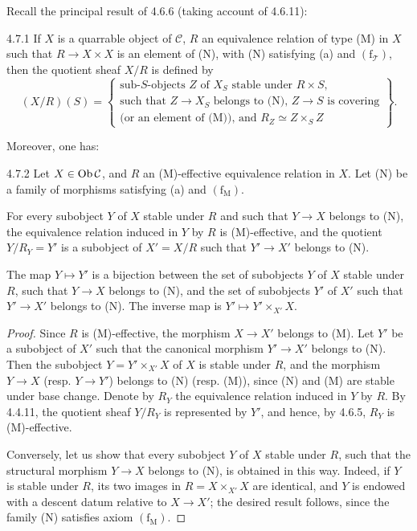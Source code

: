Recall the principal result of 4.6.6 (taking account of 4.6.11):
\begin{proposition}{4.7.1}\label{IV.4.7.1}
If \(X\) is a quarrable object of \(\mathcal C\),
\(R\) an equivalence relation of type (M) in \(X\)
such that \(R\to X\times X\) is an element of (N),
with (N) satisfying (a) and \((\mathrm f_{\mathcal T})\),
then the quotient sheaf \(X/R\) is defined by
\[
(X/R)(S)=\left\{\begin{array}{l}
\text{sub-}S\text{-objects }Z\text{ of }X_S\text{ stable under }R\times S,\\
\text{such that }Z\to X_S\text{ belongs to (N), }Z\to S\text{ is covering}\\
\text{(or an element of (M)), and }R_Z\simeq Z\times_S Z
\end{array}\right\}.
\]
\end{proposition}
Moreover, one has:
\begin{proposition}{4.7.2}\label{IV.4.7.2}
Let \(X\in\operatorname{Ob}\mathcal C\), and \(R\) an (M)-effective
equivalence relation in \(X\). Let (N) be a family of
morphisms satisfying (a) and \((\mathrm f_{\mathrm M})\).

For every subobject \(Y\) of \(X\) stable under \(R\)
and such that \(Y\to X\) belongs to (N), the equivalence
relation induced in \(Y\) by \(R\) is (M)-effective, and
the quotient \(Y/R_Y=Y'\) is a subobject of \(X'=X/R\)
such that \(Y'\to X'\) belongs to (N).

The map \(Y\mapsto Y'\) is a bijection between the set
of subobjects \(Y\) of \(X\) stable under \(R\), such
that \(Y\to X\) belongs to (N), and the set of subobjects
\(Y'\) of \(X'\) such that \(Y'\to X'\) belongs to (N).
The inverse map is \(Y'\mapsto Y'\times_{X'}X\).
\end{proposition}
\begin{proof}
Since \(R\) is (M)-effective, the morphism \(X\to X'\)
belongs to (M). Let \(Y'\) be a subobject of \(X'\)
such that the canonical morphism \(Y'\to X'\) belongs
to (N). Then the subobject \(Y=Y'\times_{X'}X\) of
\(X\) is stable under \(R\), and the morphism \(Y\to X\)
(resp. \(Y\to Y'\)) belongs to (N) (resp. (M)), since
(N) and (M) are stable under base change.
Denote by \(R_Y\) the equivalence relation induced in
\(Y\) by \(R\). By 4.4.11, the quotient sheaf \(Y/R_Y\)
is represented by \(Y'\), and hence, by 4.6.5,
\(R_Y\) is (M)-effective.

Conversely, let us show that every subobject \(Y\) of
\(X\) stable under \(R\), such that the structural
morphism \(Y\to X\) belongs to (N), is obtained in this way.
Indeed, if \(Y\) is stable under \(R\), its two images
in \(R=X\times_{X'}X\) are identical, and \(Y\) is
endowed with a descent datum relative to \(X\to X'\);
the desired result follows, since the family (N)
satisfies axiom \((\mathrm f_{\mathrm M})\).
\end{proof}
